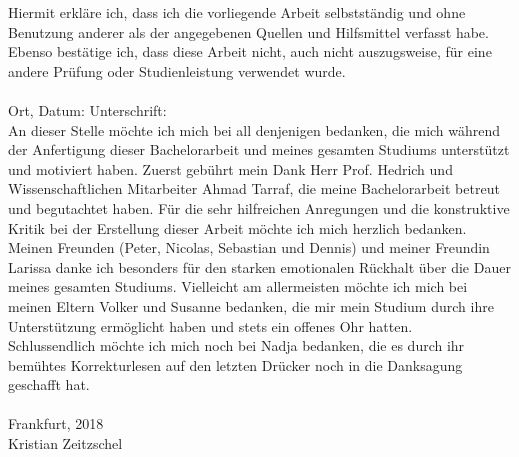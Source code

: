 \label{erklaerung}

Hiermit erkläre ich, dass ich die vorliegende Arbeit selbstständig und ohne Benutzung anderer als der angegebenen Quellen und Hilfsmittel verfasst habe. Ebenso bestätige ich, dass diese Arbeit nicht, auch nicht auszugsweise, für eine andere Prüfung oder Studienleistung verwendet wurde. \\
\\[1.5cm]
Ort, Datum:	\hrulefill\enspace Unterschrift: \hrulefill
\\[3.5cm]

\newpage
{}
\label{danksagungen}
An dieser Stelle möchte ich mich bei all denjenigen bedanken, die mich während der Anfertigung dieser Bachelorarbeit und meines gesamten Studiums unterstützt und motiviert haben.
Zuerst gebührt mein Dank Herr Prof. Hedrich und Wissenschaftlichen Mitarbeiter Ahmad Tarraf, die meine Bachelorarbeit betreut und begutachtet haben. Für die sehr hilfreichen Anregungen und die konstruktive Kritik bei der Erstellung dieser Arbeit möchte ich mich herzlich bedanken.
Meinen Freunden (Peter, Nicolas, Sebastian und Dennis) und meiner Freundin Larissa danke ich besonders für den starken emotionalen Rückhalt über die Dauer meines gesamten Studiums.
Vielleicht am allermeisten möchte ich mich bei meinen Eltern Volker und Susanne bedanken, die mir mein Studium durch ihre Unterstützung ermöglicht haben und stets ein offenes Ohr hatten. \\
Schlussendlich möchte ich mich noch bei Nadja bedanken, die es durch ihr bemühtes Korrekturlesen auf den letzten Drücker noch in die Danksagung geschafft hat.\\
\\
Frankfurt, 2018\\
Kristian Zeitzschel

